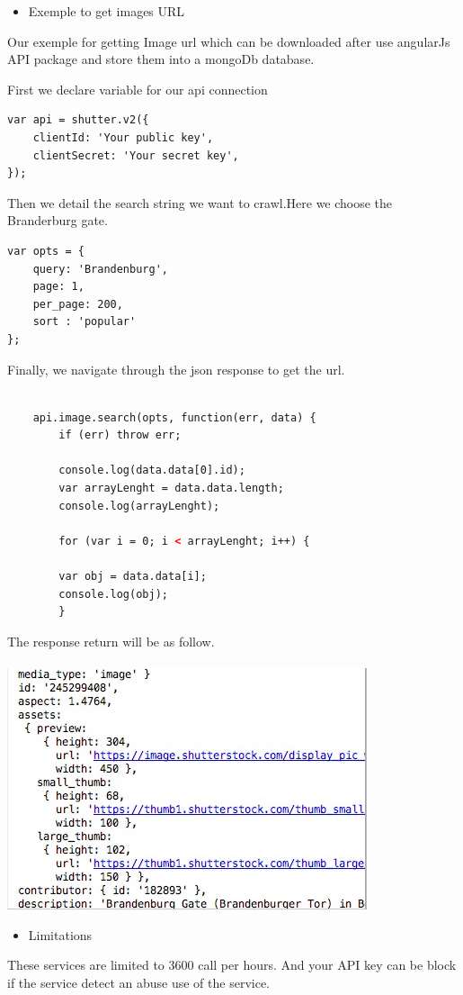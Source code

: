 \begin{itemize}
    \item {Exemple to get images URL}
\end{itemize}
Our exemple for getting Image url which can be downloaded after use angularJs API package and store them into a mongoDb database.

First we declare variable for our api connection
\begin{lstlisting}[language=XML, basicstyle=\scriptsize]
var api = shutter.v2({
    clientId: 'Your public key',
    clientSecret: 'Your secret key',
});
\end{lstlisting}
Then we detail the search string we want to crawl.Here we choose the Branderburg gate.
\begin{lstlisting}[language=XML, basicstyle=\scriptsize]
var opts = {
    query: 'Brandenburg',
    page: 1,
    per_page: 200,
    sort : 'popular'
};
\end{lstlisting}
Finally, we navigate through the json response to get the url.
\begin{lstlisting}[language=XML, basicstyle=\scriptsize]

    api.image.search(opts, function(err, data) {
        if (err) throw err;

        console.log(data.data[0].id);
        var arrayLenght = data.data.length;
        console.log(arrayLenght);

        for (var i = 0; i < arrayLenght; i++) {

        var obj = data.data[i];
        console.log(obj);
        }
\end{lstlisting}
The response return will be as follow.\\
\\
\includegraphics{jsonShutter}
\begin{itemize}
    \item {Limitations}
\end{itemize}
These services are limited to 3600 call per hours. And your API key can be block if the service detect an abuse use of the service.

